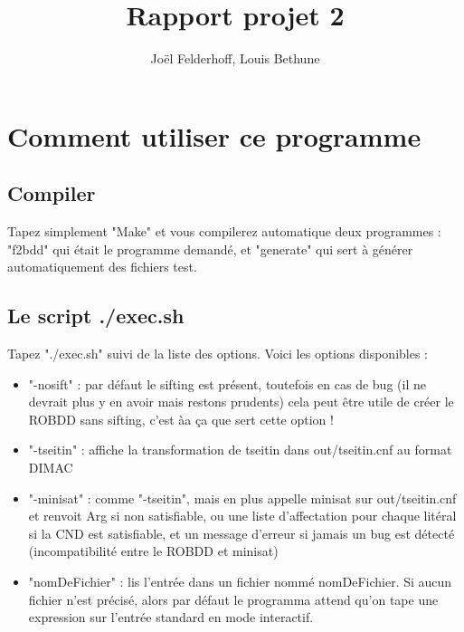 \documentclass[a4paper,10pt]{article}
\title{Rapport projet 2}
\author{Joël Felderhoff, Louis Bethune}
\begin{document}

\posttitle{\end{center}}
\maketitle

\section{Comment utiliser ce programme}

\subsection{Compiler}

Tapez simplement "Make" et vous compilerez automatique deux programmes : "f2bdd" qui était le programme demandé, et "generate" qui sert à générer automatiquement des fichiers test.  

\subsection{Le script ./exec.sh}

Tapez "./exec.sh" suivi de la liste des options.
Voici les options disponibles :

\begin{itemize}
\item "-nosift" : par défaut le sifting est présent, toutefois en cas de bug (il ne devrait plus y en avoir mais restons prudents) cela peut être utile de créer le ROBDD sans sifting, c'est àa ça que sert cette option !
\item "-tseitin" : affiche la transformation de tseitin dans out/tseitin.cnf au format DIMAC
\item "-minisat" : comme "-tseitin", mais en plus appelle minisat sur out/tseitin.cnf et renvoit Arg si non satisfiable, ou une liste d'affectation pour chaque litéral si la CND est satisfiable, et un message d'erreur si jamais un bug est détecté (incompatibilité entre le ROBDD et minisat)
\item "nomDeFichier" : lis l'entrée dans un fichier nommé nomDeFichier. Si aucun fichier n'est précisé, alors par défaut le programma attend qu'on tape une expression sur l'entrée standard en mode interactif.
\end{itemize}
\end{document}
